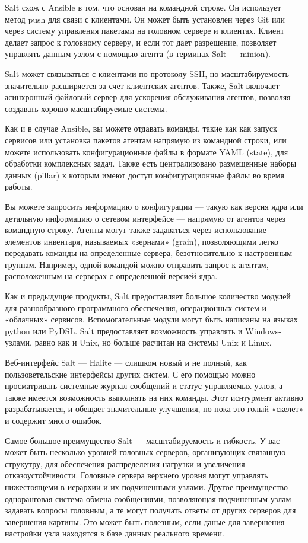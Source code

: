 \documentclass{../industrial-development}
\begin{document}
\lecturenotes
Salt схож с Ansible в том, что основан на командной строке. Он использует метод push для связи с клиентами. Он может быть установлен через Git или через систему управления пакетами на головном сервере и клиентах. Клиент делает запрос к головному серверу, и если тот дает разрешение, позволяет управлять данным узлом с помощью агента (в терминах Salt — minion).

Salt может связываться с клиентами по протоколу SSH, но масштабируемость значительно расширяется за счет клиентских агентов. Также, Salt включает асинхронный файловый сервер для ускорения обслуживания агентов, позволяя создавать хорошо масштабируемые системы.

Как и в случае Ansible, вы можете отдавать команды, такие как как запуск сервисов или установка пакетов агентам напрямую из командной строки, или можете использовать конфигурационные файлы в формате YAML (state), для обработки комплексных задач. Также есть централизовано размещенные наборы данных (pillar) к которым имеют доступ конфигурационные файлы во время работы.

Вы можете запросить информацию о конфигурации — такую как версия ядра или детальную информацию о сетевом интерфейсе — напрямую от агентов через командную строку. Агенты могут также задаваться через использование элементов инвентаря, называемых «зернами» (grain), позволяющими легко передавать команды на определенные сервера, безотносительно к настроенным группам. Например, одной командой можно отправить запрос к агентам, расположенным на серверах с определенной версией ядра.

Как и предыдущие продукты, Salt предоставляет большое количество модулей для разнообразного программного обеспечения, операционных систем и «облачных» сервисов. Вспомогательные модули могут быть написаны на языках python или PyDSL. Salt предоставляет возможность управлять и Windows-узлами, равно как и Unix, но больше расчитан на системы Unix и Linux.

Веб-интерфейс Salt — Halite — слишком новый и не полный, как пользоветельские интерфейсы других систем. С его помощью можно просматривать системные журнал сообщений и статус управляемых узлов, а также имеется возможность выполнять на них команды. Этот иснтурмент активно разрабатывается, и обещает значительные улучшения, но пока это голый «скелет» и содержит много ошибок.

Самое большое преимущество Salt — масштабируемость и гибкость. У вас может быть несколько уровней головных серверов, организующих связанную струкутру, для обеспечения распределения нагрузки и увеличения отказоустойчивости. Головные сервера верхнего уровня могут управлять нижестоящеми в иерархии и их подчиненными узлами. Другое преимущество — одноранговая система обмена сообщениями, позволяющая подчиненным узлам задавать вопросы головным, а те могут получать ответы от других серверов для завершения картины. Это может быть полезным, если даные для завершения настройки узла находятся в базе данных реального времени. 
~\cite{Instruments}
\end{document}
